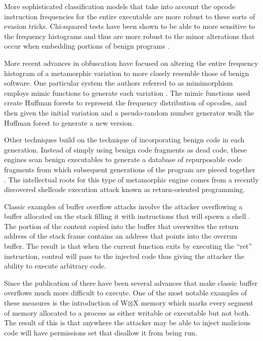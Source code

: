 \documentclass[finalcopy,short]{srpaper}
\begin{document}
  More sophisticated classification models that take into account the opcode
  instruction frequencies for the entire executable are more robust to these
  sorts of evasion tricks. Chi-squared tests have been shown to be able to more
  sensitive to the frequency histograms and thus are more robust to the minor
  alterations that occur when embedding portions of benign programs
  \cite{chisquared}.

  More recent advances in obfuscation have focused on altering the entire
  frequency histogram of a metamorphic variation to more closely resemble those
  of benign software. One particular system the authors referred to as
  mimimorphism employs mimic functions to generate each variation
  \cite{mimimorph}. The mimic functions used create Huffman forests to
  represent the frequency distribution of opcodes, and then given the initial
  variation and a pseudo-random number generator walk the Huffman forest to
  generate a new version.

  Other techniques build on the technique of incorporating benign code in each
  generation. Instead of simply using benign code fragments as dead code, these
  engines scan benign executables to generate a database of repurposable code
  fragments from which subsequent generations of the program are pieced together
  \cite{franken}. The intellectual roots for this type of metamorphic engine
  comes from a recently discovered shellcode execution attack known as
  return-oriented programming.

  Classic examples of buffer overflow attacks involve the attacker overflowing a
  buffer allocated on the stack filling it with instructions that will spawn a
  shell \cite{aleph}. The portion of the content copied into the buffer that
  overwrites the return address of the stack frame contains an address that
  points into the overrun buffer. The result is that when the current function
  exits by executing the ``ret'' instruction, control will pass to the injected
  code thus giving the attacker the ability to execute arbitrary code.

  Since the publication of \cite{aleph} there have been several advances that
  make classic buffer overflows much more difficult to execute. One of the most
  notable examples of these measures is the introduction of W$\otimes$X memory
  which marks every segment of memory allocated to a process as either writable
  or executable but not both. The result of this is that anywhere the attacker
  may be able to inject malicious code will have permissions set that disallow
  it from being run.
\end{document}
